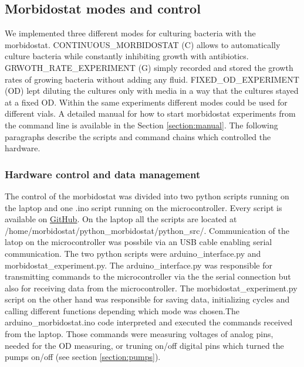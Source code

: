 \subsection{Morbidostat modes and control}
We implemented three different modes for culturing bacteria with the morbidostat. CONTINUOUS\_MORBIDOSTAT (C) allows to automatically culture bacteria while constantly inhibiting growth with antibiotics. GRWOTH\_RATE\_EXPERIMENT (G) simply recorded and stored the growth rates of growing bacteria without adding any fluid. FIXED\_OD\_EXPERIMENT (OD) lept diluting the cultures only with media in a way that the cultures stayed at a fixed OD.
Within the same experiments different modes could be used for different vials. A detailed manual for how to start morbidostat experiments from the command line is available in the Section \ref{section:manual}. The following paragraphs describe the scripts and command chains which controlled the hardware. \\

\subsubsection{Hardware control and data management}
The control of the morbidostat was divided into two python scripts running on the laptop and one .ino script running on the microcontroller. Every script is available on \href{https://github.com/nahanoo/ESBL\_project/}{GitHub}. On the laptop all the scripts are located at \newline /home/morbidostat/python\_morbidostat/python\_src/.
Communication of the latop on the microcontroller was possbile via an USB cable enabling serial communication.
The two python scripts were arduino\_interface.py and morbidostat\_experiment.py. The arduino\_interface.py was responsible for transmitting commands to the microcontroller via the the serial connection but also for receiving data from the microcontroller. The morbidostat\_experiment.py script on the other hand was responsible for saving data, initializing cycles and calling different functions depending which mode was chosen.The arduino\_morbidostat.ino code interpreted and executed the commands received from the laptop. Those commands were measuring voltages of analog pins, needed for the OD measuring, or truning on/off digital pins which turned the pumps on/off (see section \ref{section:pumps}).


